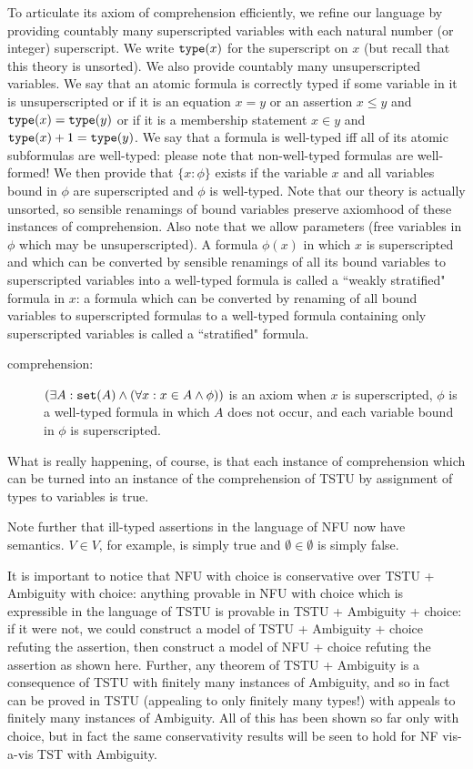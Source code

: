 \documentclass[12pt]{article}
\begin{document}
To articulate its axiom of comprehension efficiently, we refine our language by providing countably many  superscripted variables with each natural number (or integer) superscript.  We write ${\tt type}(x)$ for the superscript on $x$ (but recall that this theory is unsorted).  We also provide countably many unsuperscripted variables.  We say that
an atomic formula is correctly typed if some variable in it is unsuperscripted or if it is an equation $x=y$ or an assertion $x \leq y$  and ${\tt type}(x)={\tt type}(y)$ or if it is a membership statement $x \in y$ and ${\tt type}(x)+1={\tt type}(y)$.
We say that a formula is well-typed iff all of its atomic subformulas are well-typed:  please note that non-well-typed formulas are well-formed!  We then provide that $\{x:\phi\}$ exists if the variable $x$ and all variables bound in $\phi$ are superscripted and $\phi$ is well-typed.  Note that our theory is actually unsorted, so sensible renamings of bound variables preserve axiomhood of these instances of comprehension.   Also note that we allow parameters (free variables in $\phi$ which may be unsuperscripted).   A formula $\phi(x)$ in which $x$ is superscripted and which can be converted by sensible renamings of  all its bound variables to superscripted variables  into a well-typed formula is called a ``weakly stratified" formula in $x$:  a formula which can be converted by renaming of all bound variables to superscripted formulas to a well-typed formula containing only superscripted variables is called a ``stratified" formula.  

\begin{description}

\item[comprehension:]  $(\exists A:{\tt set}(A) \wedge (\forall x:x \in A \wedge \phi))$ is an axiom  when $x$ is superscripted, $\phi$ is a well-typed formula in which $A$ does not occur, and each variable bound in $\phi$ is superscripted.

\end{description}

What is really happening, of course, is that each instance of comprehension which can be turned into an instance of the comprehension of TSTU by assignment of types to variables is true.

Note further that ill-typed assertions in the language of NFU now have semantics.  $V \in V$, for example, is simply true and $\emptyset \in \emptyset$ is simply false.

It is important to notice that NFU with choice is conservative over TSTU + Ambiguity with choice:  anything provable in NFU with choice which is expressible in the language of TSTU is provable in TSTU + Ambiguity + choice:  if it were not, we could construct
a model of TSTU + Ambiguity + choice refuting the assertion, then construct a model of NFU + choice refuting the assertion as shown here.  Further, any theorem of TSTU + Ambiguity is a consequence of TSTU with finitely many instances of Ambiguity,
and so in fact can be proved in TSTU (appealing to only finitely many types!) with appeals to finitely many instances of Ambiguity.  All of this has been shown so far only with choice, but in fact the same conservativity results will be seen to hold for NF vis-a-vis TST with Ambiguity.
\end{document}
